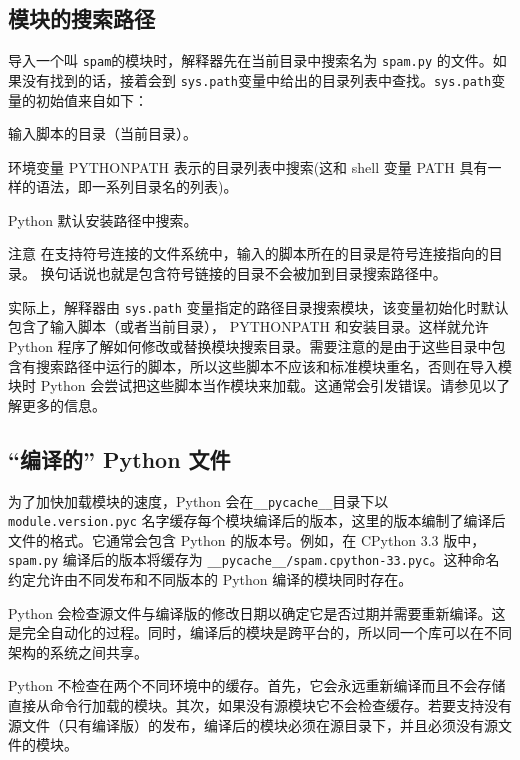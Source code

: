 \subsection{模块的搜索路径}

导入一个叫 \texttt{spam}的模块时，解释器先在当前目录中搜索名为 \texttt{spam.py} 的文件。如果没有找到的话，接着会到 \texttt{sys.path}变量中给出的目录列表中查找。\texttt{sys.path}变量的初始值来自如下：
\begin{compactitem}
    \item 输入脚本的目录（当前目录）。
    \item 环境变量 PYTHONPATH 表示的目录列表中搜索(这和 shell 变量 PATH 具有一样的语法，即一系列目录名的列表)。
    \item Python 默认安装路径中搜索。
\end{compactitem}
\begin{Warning}{注意}
在支持符号连接的文件系统中，输入的脚本所在的目录是符号连接指向的目录。 换句话说也就是包含符号链接的目录不会被加到目录搜索路径中。
\end{Warning}
实际上，解释器由 \texttt{sys.path} 变量指定的路径目录搜索模块，该变量初始化时默认包含了输入脚本（或者当前目录）， PYTHONPATH 和安装目录。这样就允许 Python 程序了解如何修改或替换模块搜索目录。需要注意的是由于这些目录中包含有搜索路径中运行的脚本，所以这些脚本不应该和标准模块重名，否则在导入模块时 Python 会尝试把这些脚本当作模块来加载。这通常会引发错误。请参见以了解更多的信息。
\subsection{“编译的” Python 文件}
为了加快加载模块的速度，Python 会在\verb|__pycache__|目录下以 \texttt{module.version.pyc} 名字缓存每个模块编译后的版本，这里的版本编制了编译后文件的格式。它通常会包含 Python 的版本号。例如，在 CPython 3.3 版中，\texttt{spam.py} 编译后的版本将缓存为 \cprotect\texttt{\verb|__pycache__|/spam.cpython-33.pyc}。这种命名约定允许由不同发布和不同版本的 Python 编译的模块同时存在。

Python 会检查源文件与编译版的修改日期以确定它是否过期并需要重新编译。这是完全自动化的过程。同时，编译后的模块是跨平台的，所以同一个库可以在不同架构的系统之间共享。

Python 不检查在两个不同环境中的缓存。首先，它会永远重新编译而且不会存储直接从命令行加载的模块。其次，如果没有源模块它不会检查缓存。若要支持没有源文件（只有编译版）的发布，编译后的模块必须在源目录下，并且必须没有源文件的模块。

